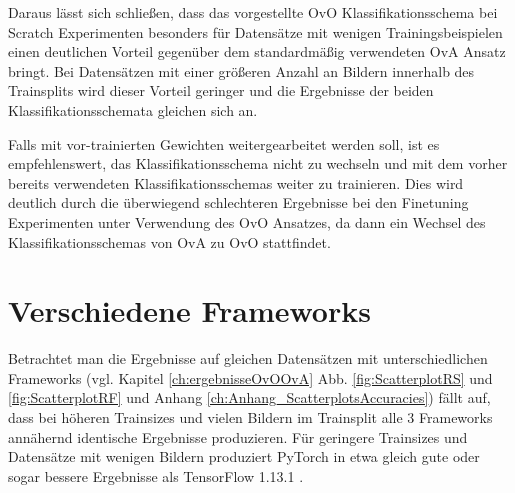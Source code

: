 Daraus lässt sich schließen, dass das vorgestellte OvO Klassifikationsschema bei Scratch Experimenten besonders für Datensätze mit wenigen Trainingsbeispielen einen deutlichen Vorteil gegenüber dem standardmäßig verwendeten OvA Ansatz bringt. Bei Datensätzen mit einer größeren Anzahl an Bildern innerhalb des Trainsplits wird dieser Vorteil geringer und die Ergebnisse der beiden Klassifikationsschemata gleichen sich an.


Falls mit vor-trainierten Gewichten weitergearbeitet werden soll, ist es empfehlenswert, das Klassifikationsschema nicht zu wechseln und mit dem vorher bereits verwendeten Klassifikationsschemas weiter zu trainieren. Dies wird deutlich durch die überwiegend schlechteren Ergebnisse bei den Finetuning Experimenten unter Verwendung des OvO Ansatzes, da dann ein Wechsel des Klassifikationsschemas von OvA zu OvO stattfindet.


\section{Verschiedene Frameworks}
\label{ch:diskussionFrameworks}

Betrachtet man die Ergebnisse auf gleichen Datensätzen mit unterschiedlichen Frameworks (vgl. Kapitel \ref{ch:ergebnisseOvOOvA} Abb. \ref{fig:ScatterplotRS} und \ref{fig:ScatterplotRF} und Anhang \ref{ch:Anhang_ScatterplotsAccuracies}) fällt auf, dass bei höheren Trainsizes und vielen Bildern im Trainsplit alle 3 Frameworks annähernd identische Ergebnisse produzieren. Für geringere Trainsizes und Datensätze mit wenigen Bildern 
produziert PyTorch \cite{pytorch} in etwa gleich gute oder sogar bessere Ergebnisse als TensorFlow 1.13.1 \cite{tensorflow}. 


